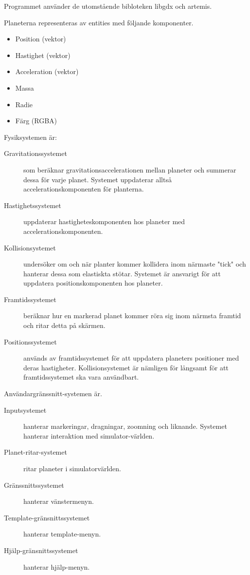 Programmet använder de utomstående bibloteken libgdx och artemis.

Planeterna representeras av entities med följande komponenter.
\begin{itemize}
    \item Position (vektor)
    \item Hastighet (vektor)
    \item Acceleration (vektor)
    \item Massa
    \item Radie
    \item Färg (RGBA)
\end{itemize}

\vspace{6pt}

Fysiksystemen är:
\begin{description}
    \item[Gravitationssystemet] som beräknar gravitationsaccelerationen mellan planeter
        och summerar dessa för varje planet.
        Systemet uppdaterar alltså accelerationskomponenten för planterna.
    \item[Hastighetssystemet] uppdaterar hastigheteskomponenten hos
        planeter med accelerationskomponenten.
    \item[Kollisionsystemet] undersöker om och när planter kommer kollidera
        inom närmaste "tick" och hanterar dessa som elastiskta stötar.
        Systemet är ansvarigt för att uppdatera positionskomponenten
        hos planeter.
    \item[Framtidssystemet] beräknar hur en markerad planet
        kommer röra sig inom närmsta framtid och ritar detta på skärmen.
    \item[Positionssystemet] används av framtidssystemet för att uppdatera
        planeters positioner med deras hastigheter. Kollisionsystemet
        är nämligen för långsamt för att framtidssystemet ska
        vara användbart.
\end{description}

\vspace{6pt}

Användargränssnitt-systemen är.
\begin{description}
    \item[Inputsystemet] hanterar markeringar, dragningar,
        zoomning och liknande.
        Systemet hanterar interaktion med simulator-världen.
    \item[Planet-ritar-systemet] ritar planeter i simulatorvärlden.
    \item[Gränssnittssystemet] hanterar vänstermenyn.
    \item[Template-gränsnittssystemet] hanterar template-menyn.
    \item[Hjälp-gränsnittssystemet] hanterar hjälp-menyn.
\end{description}

